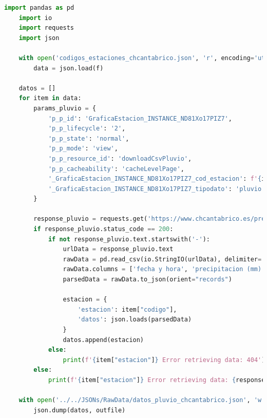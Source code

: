 \begin{lstlisting}[language=Python, caption={Script de obtención de datos pluviometricos descartado}, label=cod:22]
	import pandas as pd
	import io
	import requests
	import json
	
	with open('codigos_estaciones_chcantabrico.json', 'r', encoding='utf-8') as f:
		data = json.load(f)
		
	datos = []
	for item in data:
		params_pluvio = {
			'p_p_id': 'GraficaEstacion_INSTANCE_ND81Xo17PIZ7',
			'p_p_lifecycle': '2',
			'p_p_state': 'normal',
			'p_p_mode': 'view',
			'p_p_resource_id': 'downloadCsvPluvio',
			'p_p_cacheability': 'cacheLevelPage',
			'_GraficaEstacion_INSTANCE_ND81Xo17PIZ7_cod_estacion': f'{item["codigo"]}',
			'_GraficaEstacion_INSTANCE_ND81Xo17PIZ7_tipodato': 'pluvio',
		}
		
		response_pluvio = requests.get('https://www.chcantabrico.es/precipitacion-acumulada', params=params_pluvio)
		if response_pluvio.status_code == 200:
			if not response_pluvio.text.startswith('-'):
				urlData = response_pluvio.text
				rawData = pd.read_csv(io.StringIO(urlData), delimiter=';', encoding='utf-8', header=1)
				rawData.columns = ['fecha y hora', 'precipitacion (mm)']
				parsedData = rawData.to_json(orient="records")
				
				estacion = {
					'estacion': item["codigo"],
					'datos': json.loads(parsedData)
				}
				datos.append(estacion)
			else:
				print(f'{item["estacion"]} Error retrieving data: 404')
		else:
			print(f'{item["estacion"]} Error retrieving data: {response_pluvio.status_code}')
	
	with open('../../JSONs/RawData/datos_pluvio_chcantabrico.json', 'w', encoding='utf-8') as outfile:
		json.dump(datos, outfile)
\end{lstlisting}

